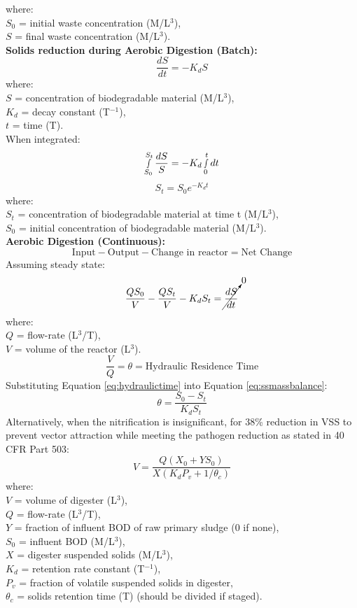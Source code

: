 \documentclass[a4paper, landscape, 8pt]{extarticle}
\begin{document}
\begin{multicols}{4}
\[\]
where:\\
$S_0$ = initial waste concentration (M/L$^3$),\\
$S$ = final waste concentration (M/L$^3$).\\
\textbf{Solids reduction during Aerobic Digestion (Batch):}
\[
\frac{dS}{dt} = -K_dS
\]
where:\\
$S$ = concentration of biodegradable material (M/L$^3$),\\
$K_d$ = decay constant (T$^{-1}$),\\
$t$ = time (T).\\
When integrated:
\[
\smallint_{S_0}^{S_t}  \frac{dS}{S} = - K_d\smallint_{0}^{t}dt
\]
\[
S_t = S_0e^{-K_dt}
\]
where:\\
$S_t$ = concentration of biodegradable material at time t (M/L$^3$),\\
$S_0$ = initial concentration of biodegradable material (M/L$^3$).\\
\textbf{Aerobic Digestion (Continuous):}
\[
\text{Input} - \text{Output} - \text{Change in reactor} = \text{Net Change}
\]
Assuming steady state:
\begin{equation}
    \frac{Q S_{0}}{V} - \frac{Q S_t}{V} - K_d S_t = \cancelto{0}{\frac{dS}{dt}} \label{eq:ssmassbalance}
\end{equation}
where:\\
$Q$ = flow-rate (L$^3$/T),\\
$V$ = volume of the reactor (L$^3$).
\begin{equation}
    \frac{V}{Q} = \theta = \text{Hydraulic Residence Time} \label{eq:hydraulictime}
\end{equation}
Substituting Equation \ref{eq:hydraulictime} into Equation \ref{eq:ssmassbalance}:
\[
\theta = \frac{S_0-S_t}{K_dS_t}
\]
Alternatively, when the nitrification is insignificant, for 38\% reduction in VSS to prevent vector attraction while meeting the pathogen reduction as stated in 40 CFR Part 503:
\[
V =\frac{Q(X_0+YS_0)}{X(K_dP_v+1/\theta_c)}
\]
where:\\
$V$ = volume of digester (L$^3$),\\
$Q$ = flow-rate (L$^3$/T),\\
$Y$ = fraction of influent BOD of raw primary sludge (0 if none),\\
$S_0$ = influent BOD (M/L$^3$),\\
$X$ = digester suspended solids (M/L$^3$),\\
$K_d$ = retention rate constant (T$^{-1}$),\\
$P_v$ = fraction of volatile suspended solids in digester,\\
$\theta_c$ = solids retention time (T) (should be divided if staged).

\end{multicols}
\end{document}
